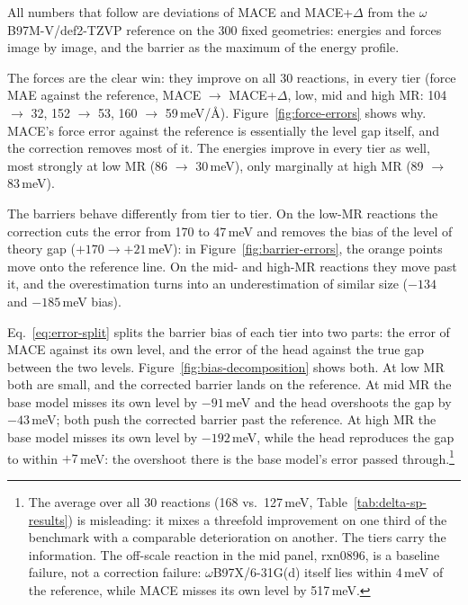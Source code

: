 All numbers that follow are deviations of MACE and MACE+$\Delta$ from
the $\omega$B97M-V/def2-TZVP reference on the 300 fixed geometries:
energies and forces image by image, and the barrier as the maximum of
the energy profile.

The forces are the clear win: they improve on all 30 reactions, in every
tier (force MAE against the reference, MACE $\rightarrow$ MACE+$\Delta$,
low, mid and high MR: 104 $\rightarrow$ 32, 152 $\rightarrow$ 53,
160 $\rightarrow$ 59\,meV/\AA). Figure~\ref{fig:force-errors} shows why. MACE's force error
against the reference is essentially the level gap itself, and the
correction removes most of it. The energies improve in every tier as well,
most strongly at low MR (86 $\rightarrow$ 30\,meV), only marginally at high
MR (89 $\rightarrow$ 83\,meV).

The barriers behave differently from tier to tier. On the low-MR
reactions the correction cuts the error
from 170 to 47\,meV and removes the bias of the level of theory gap ($+170
\rightarrow +21$\,meV): in Figure~\ref{fig:barrier-errors}, the orange
points move onto the reference line. On the mid- and high-MR reactions they
move past it, and the overestimation turns into an underestimation of
similar size ($-134$ and $-185$\,meV bias).

Eq.~\eqref{eq:error-split} splits the barrier bias of each tier into
two parts: the error of MACE against its own level, and the error of
the head against the true gap between the two levels.
Figure~\ref{fig:bias-decomposition} shows both. At low MR both are
small, and the corrected barrier lands on the reference. At mid MR
the base model misses its own level by $-91$\,meV and the head
overshoots the gap by $-43$\,meV; both push the corrected barrier
past the reference. At high MR the base model misses its own level
by $-192$\,meV, while the head reproduces the gap to within
$+7$\,meV: the overshoot there is the base model's error passed
through.\footnote{The average
over all 30 reactions (168 vs.\ 127\,meV,
Table~\ref{tab:delta-sp-results}) is misleading: it mixes a threefold
improvement on one third of the benchmark with a comparable deterioration
on another. The tiers carry the information. The off-scale reaction in the
mid panel, rxn0896, is a baseline failure, not a correction failure:
$\omega$B97X/6-31G(d) itself lies within 4\,meV of the reference, while MACE misses its
own level by 517\,meV.\label{fn:all30}}

